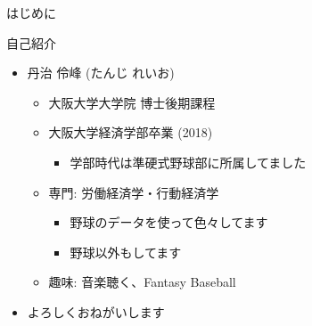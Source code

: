 \documentclass[
  ignorenonframetext,
]{beamer}
\providecommand{\tightlist}{%
  \setlength{\itemsep}{0pt}\setlength{\parskip}{0pt}}
\begin{document}
\begin{frame}{はじめに}
\begin{block}{自己紹介}
\protect\hypertarget{ux81eaux5df1ux7d39ux4ecb}{}
\begin{itemize}
\tightlist
\item
  丹治 伶峰 (たんじ れいお)

  \begin{itemize}
  \tightlist
  \item
    大阪大学大学院 博士後期課程
  \item
    大阪大学経済学部卒業 (2018)

    \begin{itemize}
    \tightlist
    \item
      学部時代は準硬式野球部に所属してました
    \end{itemize}
  \item
    専門: 労働経済学・行動経済学

    \begin{itemize}
    \tightlist
    \item
      野球のデータを使って色々してます
    \item
      野球以外もしてます
    \end{itemize}
  \item
    趣味: 音楽聴く、Fantasy Baseball
  \end{itemize}
\item
  よろしくおねがいします
\end{itemize}
\end{block}
\end{frame}
\end{document}
